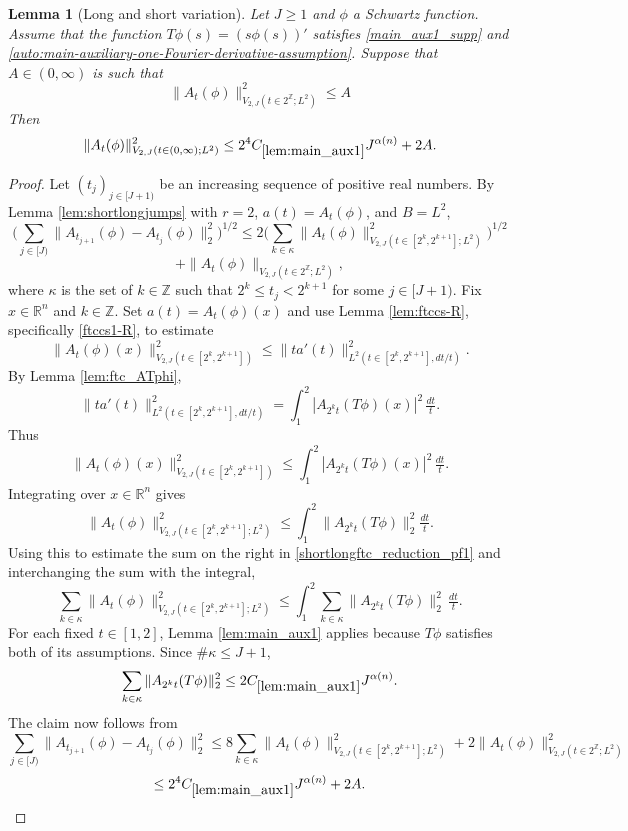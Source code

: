 \documentclass[12pt,reqno]{amsart}
\theoremstyle{plain}
\newtheorem{lemma}[theorem]{Lemma}
\numberwithin{equation}{section}
\theoremstyle{remark}
\newcommand{\uses}[1]{}
\newcommand{\usesdefs}[1]{}
\begin{document}
\begin{lemma}[Long and short variation]\label{lem:shortlongftc_reduction}\uses{lem:shortlongjumps,lem:ftccs-R,lem:ftc_ATphi,lem:main_aux1}\usesdefs{A_def}
Let $J\ge 1$ and $\phi$ a Schwartz function.
Assume that the function $T\phi(s) = (s \phi(s))'$ satisfies \eqref{main_aux1_supp} and \eqref{auto:main-auxiliary-one-Fourier-derivative-assumption}.
Suppose that $A\in (0,\infty)$ is such that
\begin{equation}\label{shortlongftc_reduction1} \|A_{t}(\phi)\|^2_{V_{2,J}(t\in 2^\mathbb{Z}; L^2)} \le A
\end{equation}
Then
\begin{equation}\label{shortlongftc_reduction2}
\|A_{t}(\phi)\|_{V_{2,J}(t\in (0,\infty); L^2)}^2 \le 2^4 C_{\ref{lem:main_aux1}} J^{\alpha(n)} + 2A.
\end{equation}
\end{lemma}

\begin{proof}
Let $(t_j)_{j\in[J+1)}$ be an increasing sequence of positive real numbers.
By Lemma \ref{lem:shortlongjumps} with $r=2$, $a(t)=A_t(\phi)$, and $B=L^2$,
\begin{equation}\label{shortlongftc_reduction_pf1}
\Big(\sum_{j\in [J)} \|A_{t_{j+1}}(\phi)- A_{t_j}(\phi)\|_2^2\Big)^{1/2}
\le 2 \Big(\sum_{k\in \kappa} \|A_t(\phi)\|_{V_{2,J}(t\in [2^k, 2^{k+1}]; L^2)}^2\Big)^{1/2}
\end{equation}
\begin{equation}\label{shortlongftc_reduction_pf2}
+\|A_t(\phi)\|_{V_{2,J}(t\in 2^\mathbb{Z}; L^2)},
\end{equation}
where $\kappa$ is the set of $k\in \mathbb{Z}$ such that $2^{k}\le t_j<2^{k+1}$ for some $j\in [J+1)$.
Fix $x\in\mathbb{R}^n$ and $k\in\mathbb{Z}$. Set $a(t)=A_t(\phi)(x)$ and use Lemma \ref{lem:ftccs-R}, specifically \eqref{ftccs1-R}, to estimate
\[
\|A_t(\phi)(x)\|_{V_{2,J}(t\in [2^k, 2^{k+1}])}^2
\le
\|ta'(t)\|_{L^2(t\in [2^k, 2^{k+1}],dt/t)}^2.
\]
By Lemma \ref{lem:ftc_ATphi},
\[
\|ta'(t)\|_{L^2(t\in [2^k, 2^{k+1}],dt/t)}^2
=
\int_{1}^2 |A_{2^k t}(T\phi)(x)|^2\,\tfrac{dt}{t}.
\]
Thus
\[
\|A_t(\phi)(x)\|_{V_{2,J}(t\in [2^k, 2^{k+1}])}^2
\le
\int_{1}^2 |A_{2^k t}(T\phi)(x)|^2\,\tfrac{dt}{t}.
\]
Integrating over $x\in\mathbb{R}^n$ gives
\[
\|A_t(\phi)\|_{V_{2,J}(t\in [2^k, 2^{k+1}]; L^2)}^2
\le
\int_1^2 \|A_{2^k t}(T\phi)\|_2^2 \tfrac{dt}{t}.
\]
Using this to estimate the sum on the right in \eqref{shortlongftc_reduction_pf1} and interchanging the sum with the integral,
\[
\sum_{k\in \kappa} \|A_t(\phi)\|_{V_{2,J}(t\in [2^k, 2^{k+1}]; L^2)}^2
\le
\int_1^2 \sum_{k\in\kappa} \|A_{2^k t}(T\phi)\|_2^2\,\tfrac{dt}{t}.
\]
For each fixed $t\in [1,2]$, Lemma \ref{lem:main_aux1} applies because $T\phi$ satisfies both of its assumptions. Since $\#\kappa\le J+1$,
\[
\sum_{k\in\kappa} \|A_{2^k t}(T\phi)\|_2^2
\le 2 C_{\ref{lem:main_aux1}} J^{\alpha(n)}.
\]
The claim now follows from
\[
\sum_{j\in [J)} \|A_{t_{j+1}}(\phi)- A_{t_j}(\phi)\|_2^2
\le 8 \sum_{k\in \kappa} \|A_t(\phi)\|_{V_{2,J}(t\in [2^k, 2^{k+1}]; L^2)}^2
+ 2 \|A_t(\phi)\|_{V_{2,J}(t\in 2^\mathbb{Z}; L^2)}^2
\]
\[
\le 2^4 C_{\ref{lem:main_aux1}} J^{\alpha(n)} + 2A.
\]
\end{proof}
\end{document}
